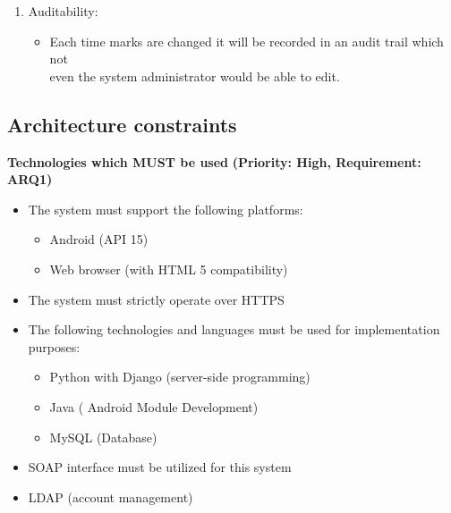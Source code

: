 \documentclass[12pt]{article}
\begin{document}
\begin{enumerate}
			
	\item Auditability:		
			\begin{itemize}
			\item Each time marks are changed it will be recorded in an audit trail which not\\
			even the system administrator would be able to edit.
			\end{itemize}
			
\end{enumerate}			
		
	
			\vspace{0.2in}			
			
			
				
		\subsection{Architecture constraints}
	
		\vspace{0.2in}
		
		\begin{flushleft}
				\textbf{Technologies which MUST be used}
				\newline\textbf{(Priority: High, Requirement: ARQ1)}
		\end{flushleft}
			
			\vspace{0.05in}
		\begin{itemize}
					\item The system must support the following platforms: 
						\begin{itemize}
							\item Android (API 15)
							\item Web browser (with HTML 5 compatibility)
						\end{itemize}
						
					\item The system must strictly operate over HTTPS
					\item The following technologies and languages must be used for implementation purposes:
						\begin{itemize}
							\item Python with Django (server-side programming)
							\item Java ( Android Module Development)
							\item MySQL (Database)
						\end{itemize}
						\item SOAP interface must be utilized for this system
						\item LDAP (account management)
		\end{itemize}
		
\end{document}
